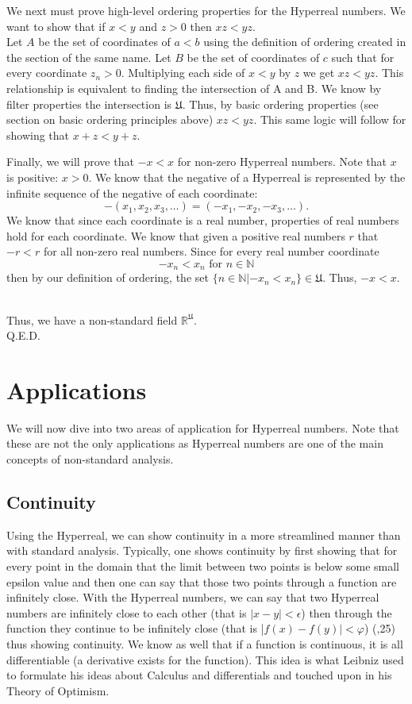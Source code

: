 \documentclass[12pt]{report}
\newcommand{\R}{\mathbb{R}}
\newcommand{\N}{\mathbb{N}}
\newcommand{\U}{\mathfrak{U}}
\begin{document}
We next must prove high-level ordering properties for the Hyperreal numbers. \newline
We want to show that if $x<y$ and $z>0$ then $xz<yz$. \\
Let $A$ be the set of coordinates of $a<b$ using the definition of ordering created in the section of the same name.
Let $B$ be the set of coordinates of $c$ such that for every coordinate $z_n > 0$.
Multiplying each side of $x<y$ by $z$ we get $xz<yz$.
This relationship is equivalent to finding the intersection of A and B.
We know by filter properties the intersection is $\U$.
Thus, by basic ordering properties (see section on basic ordering principles above) $xz<yz$.
This same logic will follow for showing that $x+z < y+z$.

\newline \par
Finally, we will prove that $-x <x $ for non-zero Hyperreal numbers.
Note that $x$ is positive: $x > 0$.
We know that the negative of a Hyperreal is represented by the infinite sequence of the negative of each coordinate: \[-(x_1, x_2,x_3,\ldots) = (-x_1,- x_2,-x_3,\ldots).\]
We know that since each coordinate is a real number, properties of real numbers hold for each coordinate.
We know that given a positive real numbers $r$ that $-r< r$ for all non-zero real numbers.
Since for every real number coordinate \[-x_n <x_n \text{ for } n \in \N \] then by our definition of ordering, the set $\{n \in \N| -x_n < x_n \} \in \U$.
Thus, $-x <x $.

\\ \newline
Thus, we have a non-standard field $\R^{\U}$.\\
Q.E.D.


\chapter{Applications}
We will now dive into two areas of application for Hyperreal numbers.
Note that these are not the only applications as Hyperreal numbers are one of the main concepts of non-standard analysis.
\section*{Continuity}
Using the Hyperreal, we can show continuity in a more streamlined manner than with standard analysis.
Typically, one shows continuity by first showing that for every point in the domain that the limit between two points is below some small epsilon value and then one can say that those two points through a function are infinitely close.
With the Hyperreal numbers, we can say that two Hyperreal numbers are infinitely close to each other (that is $|x-y|< \epsilon$) then through the function they continue to be infinitely close (that is |$f(x)-f(y)|<\varphi$) (\citeauthor{Goldbring},25) thus showing continuity.
We know as well that if a function is continuous, it is all differentiable (a derivative exists for the function).
This idea is what Leibniz used to formulate his ideas about Calculus and differentials and touched upon in his Theory of Optimism.
\end{document}
